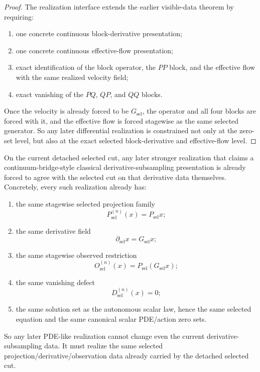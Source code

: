 \begin{proof}
The realization interface extends the earlier visible-data theorem by requiring:
\begin{enumerate}
\item one concrete continuous block-derivative presentation;
\item one concrete continuous effective-flow presentation;
\item exact identification of the block operator, the \(PP\) block, and the
      effective flow with the same realized velocity field;
\item exact vanishing of the \(PQ\), \(QP\), and \(QQ\) blocks.
\end{enumerate}
Once the velocity is already forced to be \(G_{\mathrm{sel}}\), the
operator and all four blocks are forced with it, and the effective flow is
forced stagewise as the same selected generator. So any later differential
realization is constrained not only at the zero-set level, but also
at the exact selected block-derivative and effective-flow level.
\end{proof}

\begin{theorem}
\label{thm:the-selected-cut-already-fixes-the-derivative-subsampling-contract-for-any-later-stronger-flagship-realization}
On the current detached selected cut, any later stronger realization
that claims a continuum-bridge-style classical derivative-subsampling presentation is
already forced to agree with the selected cut on that derivative data
themselves. Concretely, every such realization already has:
\begin{enumerate}
\item the same stagewise selected projection family
\[
P_{\mathrm{sel}}^{(n)}(x)=P_{\mathrm{sel}}x;
\]
\item the same derivative field
\[
\partial_{\mathrm{sel}}x=G_{\mathrm{sel}}x;
\]
\item the same stagewise observed restriction
\[
O_{\mathrm{sel}}^{(n)}(x)=P_{\mathrm{sel}}(G_{\mathrm{sel}}x);
\]
\item the same vanishing defect
\[
D_{\mathrm{sel}}^{(n)}(x)=0;
\]
\item the same solution set as the autonomous scalar law, hence the same
      selected equation and the same canonical scalar PDE/action zero sets.
\end{enumerate}
So any later PDE-like realization cannot change even the current
derivative-subsampling data. It must realize the same selected
projection/derivative/observation data already carried by the detached
selected cut.
\end{theorem}

